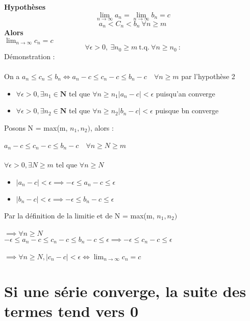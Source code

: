 \documentclass{article}
\begin{document}
\textbf{Hypothèses} \\
\[ \lim_{n\to\infty}a_n = \lim_{n\to\infty}b_n = c \]
\[ a_n < C_n < b_n\ \forall n \geq m \]
\textbf{Alors} \\
$\lim_{n\to\infty}c_n = c$
\[ \forall \epsilon > 0,\ \exists n_0 \geq m\ \text{t.q.}\ \forall n \geq n_0\ \text{:} \]
Démonstration :\\\\
On a $a_n \leq c_n \leq b_n \Leftrightarrow a_n - c \leq c_n - c \leq b_n - c \quad \forall n \geq m$ par l'hypothèse 2 \\
\begin{itemize}
    \item $\forall \epsilon > 0,\exists n_1 \in \mathbf{N}$ tel que $\forall n\geq n_1 \lvert a_n - c \lvert < \epsilon$ puisqu'an converge
    \item $\forall \epsilon > 0,\exists n_2 \in \mathbf{N}$ tel que $\forall n\geq n_2 \lvert b_n - c \lvert < \epsilon$ puisque bn converge
\end{itemize}
Posons N = max(m, $n_1, n_2)$, alors : \\\\
$a_n - c \leq c_n - c \leq b_n - c \quad \forall n \geq N \geq m $\\\\
$\forall \epsilon > 0,\exists N \geq m$ tel que $\forall n\geq N$
\begin{itemize}
    \item $ \lvert a_n - c \lvert < \epsilon \implies -\epsilon \leq a_n - c \leq \epsilon$
    \item $ \lvert b_n - c \lvert < \epsilon \implies -\epsilon \leq b_n - c \leq \epsilon$
\end{itemize}
Par la définition de la limitie et de N = max(m, $n_1, n_2)$ \\\\
$ \implies \forall n\geq N$ \\
$-\epsilon \leq a_n - c \leq c_n - c \leq b_n - c \leq \epsilon \implies -\epsilon\leq c_n - c \leq \epsilon $ \\\\
$\implies \forall n \geq N, \lvert c_n - c \lvert < \epsilon \Leftrightarrow \lim_{n\to\infty}c_n = c$

\newpage

\section{Si une série converge, la suite des termes tend vers 0}
\end{document}
